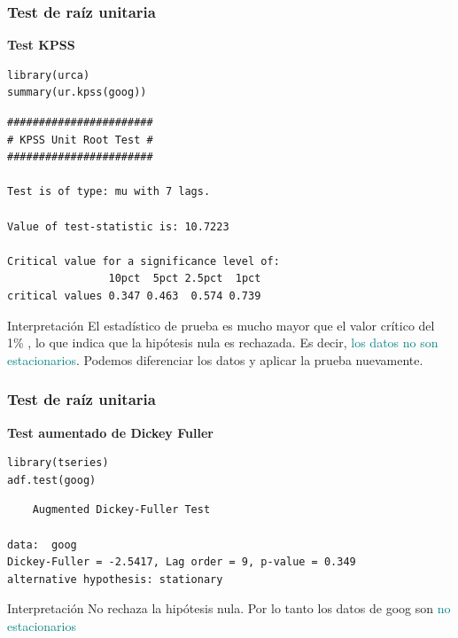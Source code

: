 \documentclass[10pt]{beamer}
\begin{document}




\begin{frame}[fragile]
\frametitle{Test de raíz unitaria}

\textbf{Test KPSS}

\lstset{language=r,label= ,caption= ,captionpos=b,numbers=none}
\begin{lstlisting}
library(urca)
summary(ur.kpss(goog))
\end{lstlisting}

\pause

{\scriptsize
\begin{verbatim}
####################### 
# KPSS Unit Root Test # 
####################### 

Test is of type: mu with 7 lags. 

Value of test-statistic is: 10.7223 

Critical value for a significance level of: 
                10pct  5pct 2.5pct  1pct
critical values 0.347 0.463  0.574 0.739
\end{verbatim}
}

\pause

{\small
\begin{block}{Interpretación}
El estadístico de prueba \textbf{} es mucho mayor que el valor crítico del 1\% , lo que indica que la hipótesis nula es rechazada. Es decir, \textcolor{teal}{los datos no son estacionarios}. Podemos diferenciar los datos y aplicar la prueba nuevamente.
\end{block}
}


\end{frame}




\begin{frame}[fragile]
\frametitle{Test de raíz unitaria}

\textbf{Test aumentado de Dickey Fuller}

\lstset{language=r,label= ,caption= ,captionpos=b,numbers=none}
\begin{lstlisting}
library(tseries)
adf.test(goog)
\end{lstlisting}

\pause

{\scriptsize
\begin{verbatim}
	Augmented Dickey-Fuller Test

data:  goog
Dickey-Fuller = -2.5417, Lag order = 9, p-value = 0.349
alternative hypothesis: stationary
\end{verbatim}
}

\pause

{\small
\begin{block}{Interpretación}
No rechaza la hipótesis nula. Por lo tanto los datos de goog son \textcolor{teal}{no estacionarios}
\end{block}
}


\end{frame}
\end{document}
